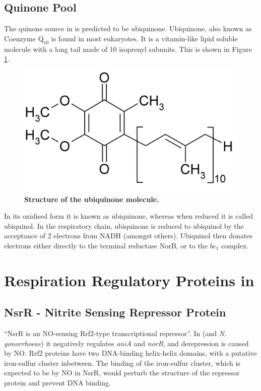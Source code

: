 \subsection{Quinone Pool}
The quinone source in \Nm{} is predicted to be ubiquinone\cite{Deeudom2007}. Ubiquinone, also known as Coenzyme $\mathrm{Q}_{10}$ is found in most eukaryotes. It is a vitamin-like lipid soluble molecule with a long tail made of 10 isoprenyl subunits. This is shown in Figure \ref{fig:Ubiquinone}.

\begin{figure}[tbp]
	\begin{center}
		\includegraphics[width=14cm]{01-introduction/data/Ubiquinone.png}
	\caption[{Structure of the ubiquinone molecule.}]{{\bf Structure of the ubiquinone molecule.}
	\label{fig:Ubiquinone}}
	\end{center}
\end{figure}

In its oxidised form it is known as ubiquinone, whereas when reduced it is called ubiquinol. In the \Nm{} respiratory chain, ubiquinone is reduced to ubiquinol by the acceptance of 2 electrons from NADH (amongst others). Ubiquinol then donates electrons either directly to the terminal reductase NorB, or to the $bc_1$ complex.

\section{Respiration Regulatory Proteins in \Nm{}}
\subsection{NsrR - Nitrite Sensing Repressor Protein}
``NsrR is an NO-sensing Rrf2-type transcriptional repressor''\cite{Barth2009}. In \Nm{} (and \textit{N. gonorrhoeae}) it negatively regulates \textit{aniA} and \textit{norB}, and derepression is caused by NO\cite{Rock2007,Heurlier2008,Isabella2008}. Rrf2 proteins have two DNA-binding helix-helix domains\cite{Rock2007}, with a putative iron-sulfur cluster inbetween. The binding of the iron-sulfur cluster, which is expected to be by NO in NsrR, would perturb the structure of the repressor protein and prevent DNA binding\cite{Rock2007}.

